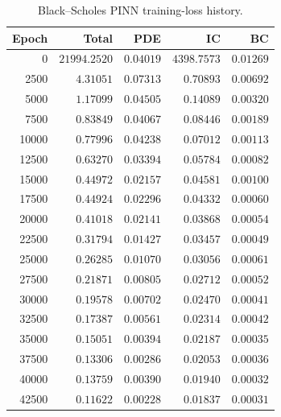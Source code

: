 \begin{table}[H]
    \centering
    \begin{minipage}[t]{0.48\linewidth}
        \centering
        \footnotesize
        \setlength{\tabcolsep}{3pt}
        \renewcommand{\arraystretch}{1.2}
        \caption{Black--Scholes PINN training-loss history.}
        \label{tab:bs_training_loss_history}
        \begin{tabular}{rrrrr}
            \hline
            \textbf{Epoch} & \textbf{Total} & \textbf{PDE} & \textbf{IC} & \textbf{BC} \\
            \hline
                 0 & $21994.2520$ & $0.04019$ & $4398.7573$ & $0.01269$ \\
              2500 & $4.31051$    & $0.07313$ & $0.70893$   & $0.00692$ \\
              5000 & $1.17099$    & $0.04505$ & $0.14089$   & $0.00320$ \\
              7500 & $0.83849$    & $0.04067$ & $0.08446$   & $0.00189$ \\
             10000 & $0.77996$    & $0.04238$ & $0.07012$   & $0.00113$ \\
             12500 & $0.63270$    & $0.03394$ & $0.05784$   & $0.00082$ \\
             15000 & $0.44972$    & $0.02157$ & $0.04581$   & $0.00100$ \\
             17500 & $0.44924$    & $0.02296$ & $0.04332$   & $0.00060$ \\
             20000 & $0.41018$    & $0.02141$ & $0.03868$   & $0.00054$ \\
             22500 & $0.31794$    & $0.01427$ & $0.03457$   & $0.00049$ \\
             25000 & $0.26285$    & $0.01070$ & $0.03056$   & $0.00061$ \\
             27500 & $0.21871$    & $0.00805$ & $0.02712$   & $0.00052$ \\
             30000 & $0.19578$    & $0.00702$ & $0.02470$   & $0.00041$ \\
             32500 & $0.17387$    & $0.00561$ & $0.02314$   & $0.00042$ \\
             35000 & $0.15051$    & $0.00394$ & $0.02187$   & $0.00035$ \\
             37500 & $0.13306$    & $0.00286$ & $0.02053$   & $0.00036$ \\
             40000 & $0.13759$    & $0.00390$ & $0.01940$   & $0.00032$ \\
             42500 & $0.11622$    & $0.00228$ & $0.01837$   & $0.00031$ \\

\end{tabular}
\end{minipage}
\end{table}

